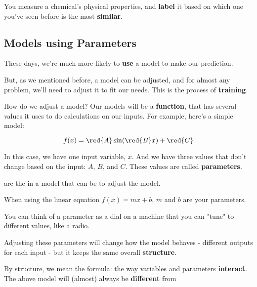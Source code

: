         \miniex You measure a chemical's physical properties, and \textbf{label} it based on which one you've seen before is the most \textbf{similar}.
        
    \subsection{Models using Parameters}
    
        These days, we're much more likely to \textbf{use} a model to make our prediction.
        
        But, as we mentioned before, a model can be adjusted, and for almost any problem, we'll need to adjust it to fit our needs. This is the process of \textbf{training}.
        
        How do we adjust a model? Our models will be a \textbf{function}, that has several values it uses to do calculations on our inputs. For example, here's a simple model:
        
        \begin{equation}
            f(x) = \red{A}\sin(\red{B}x) + \red{C}
        \end{equation}
        
        In this case, we have one input variable, $x$. And we have three values that don't change based on the input: $A$, $B$, and $C$. These values are called \textbf{parameters}.\\
        
        \begin{definition}
             are the   in a model that can be  to adjust the model.
        \end{definition}
        
        \miniex When using the linear equation $f(x) = mx+b$, $m$ and $b$ are your parameters.
    
        You can think of a parameter as a dial on a machine that you can "tune" to different values, like a radio.
        
        Adjusting these parameters will change how the model behaves - different outputs for each input - but it keeps the same overall \textbf{structure}.
        
        By structure, we mean the formula: the way variables and parameters \textbf{interact}. The above model will (almost) always be \textbf{different} from 
        \\
        
